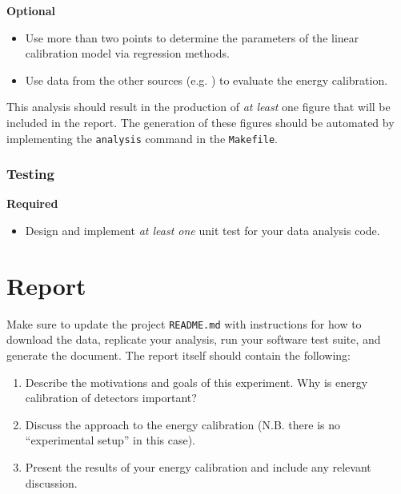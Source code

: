 \documentclass[11pt]{article}
\begin{document}
{\bf Optional}
\begin{itemize}
  \item Use more than two points to determine the parameters of the linear
        calibration model via regression methods.
  \item Use data from the other sources (e.g. ) to evaluate the
        energy calibration.
\end{itemize}

This analysis should result in the production of \textit{at least} one figure
that will be included in the report.
The generation of these figures should be automated by implementing the 
{\tt analysis} command in the {\tt Makefile}.

\subsubsection*{Testing}

{\bf Required}
\begin{itemize}
  \item Design and implement \textit{at least one} unit test for your data
        analysis code.
\end{itemize}

\section*{Report}

Make sure to update the project {\tt README.md} with instructions for how to 
download the data, replicate your analysis, run your software test suite, and
generate the document.
The report itself should contain the following:

\begin{enumerate}
  \item Describe the motivations and goals of this experiment. Why is energy
        calibration of detectors important?
  \item Discuss the approach to the energy calibration (N.B. there is no
        ``experimental setup'' in this case).
  \item Present the results of your energy calibration and include any
        relevant discussion.
\end{enumerate}

%
\end{document}
